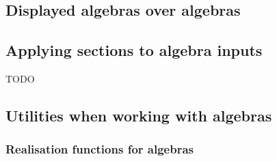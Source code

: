 \subsection{Displayed algebras over algebras}


\subsection{Applying sections to algebra inputs}

TODO


\subsection{Utilities when working with algebras} \label{app:algebras}

\subsubsection{Realisation functions for algebras}\label{app:reprs}



